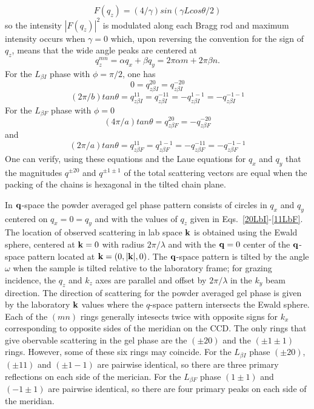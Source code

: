 \documentclass[
 preprint,
 showkeys, 
 amsmath,
 amssymb,
 aps,
]{revtex4-1}
\begin{document}
\begin{equation}\label{int}
F(q_z) = (4/\gamma)sin({\gamma}Lcos{\theta}/2)
\end{equation}
so the intensity $|F(q_z)|^2$ is modulated along each Bragg rod and maximum intensity occurs when $\gamma=0$ which, upon reversing the convention for the sign of $q_z$, means that the wide angle peaks are centered at
\begin{equation}\label{centers}
q_z^{mn}={\alpha}q_x+{\beta}q_y=2\pi\alpha{m}+2\pi\beta{n}.
\end{equation}
For the $L_{{\beta}I}$ phase with ${\phi}={\pi}/2$, one has
\begin{equation}\label{20LbI}
0=q_{z{\beta}I}^{20}=q_{z{\beta}I}^{-20}
\end{equation}
\begin{equation}\label{11LbI}
(2\pi/b)tan{\theta}=q_{z{\beta}I}^{11}=q_{z{\beta}I}^{-11}=-q_{z{\beta}I}^{1-1}=-q_{z{\beta}I}^{-1-1}
\end{equation}
For the $L_{{\beta}F}$ phase with ${\phi}=0$
\begin{equation}\label{20LbF}
(4\pi/a)tan{\theta}=q_{z{\beta}F}^{20}=-q_{z{\beta}F}^{-20}
\end{equation}
and
\begin{equation}\label{11LbF}
(2\pi/a)tan{\theta}=q_{z{\beta}F}^{11}=q_{z{\beta}F}^{1-1}=-q_{z{\beta}F}^{-11}=-q_{z{\beta}F}^{-1-1}
\end{equation}
One can verify, using these equations and the Laue equations for $q_x$ and $q_y$ that the magnitudes $q^{{\pm}20}$ and $q^{{\pm}1{\pm}1}$ of the total scattering vectors are equal when the packing of the chains is hexagonal in the tilted chain plane.  

In $\bold{q}$-space the powder averaged gel phase pattern consists of circles in $q_x$ and $q_y$ centered on $q_x=0=q_y$ and with the values of $q_z$ given in Eqs.~\ref{20LbI}-\ref{11LbF}.  
The location of observed scattering in lab space $\bold{k}$ is obtained using the Ewald sphere, centered at $\bold{k}=0$ with radius $2\pi/\lambda$ and with the $\bold{q}=0$ center of the $\bold{q}$-space pattern located at $\bold{k}=(0,|\bold{k}|,0)$.  The $\bold{q}$-space pattern is tilted by the angle $\omega$ when the sample is tilted relative to the laboratory frame; for grazing incidence, the $q_z$ and $k_z$ axes are parallel and offset by $2\pi/\lambda$ in the $k_y$ beam direction.  The direction of scattering for the powder averaged gel phase is given by the laboratory $\bold{k}$ values where the $q$-space pattern intersects the Ewald sphere.  Each of the $(mn)$ rings generally intesects twice with opposite signs for $k_x$ corresponding to opposite sides of the meridian on the CCD.  The only rings that give obervable scattering in the gel phase are the $(\pm20)$ and the $(\pm1\pm1)$ rings.  However, some of these six rings may coincide. For the $L_{{\beta}I}$ phase $(\pm20)$, $(\pm11)$ and $(\pm1-1)$ are pairwise identical, so there are three primary reflections on each side of the merician. For the $L_{{\beta}F}$ phase $(1\pm1)$ and $(-1\pm1)$ are pairwise identical, so there are four primary peaks on each side of the meridian.
\end{document}
